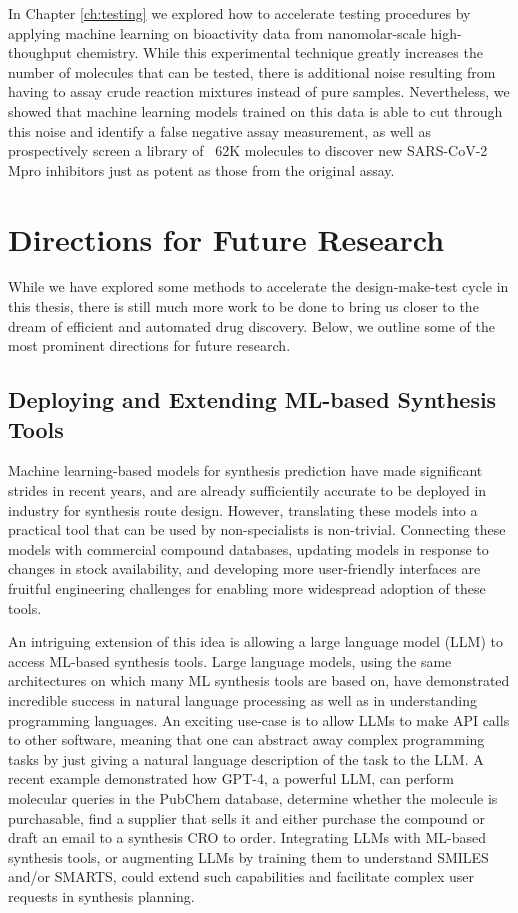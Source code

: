 In Chapter \ref{ch:testing} we explored how to accelerate testing procedures by applying machine learning on bioactivity data from nanomolar-scale high-thoughput chemistry. While this experimental technique greatly increases the number of molecules that can be tested, there is additional noise resulting from having to assay crude reaction mixtures instead of pure samples. Nevertheless, we showed that machine learning models trained on this data is able to cut through this noise and identify a false negative assay measurement, as well as prospectively screen a library of ~62K molecules to discover new SARS-CoV-2 Mpro inhibitors just as potent as those from the original assay.

\section{Directions for Future Research}

While we have explored some methods to accelerate the design-make-test cycle in this thesis, there is still much more work to be done to bring us closer to the dream of efficient and automated drug discovery. Below, we outline some of the most prominent directions for future research.

\subsection{Deploying and Extending ML-based Synthesis Tools}
Machine learning-based models for synthesis prediction have made significant strides in recent years, and are already sufficientily accurate to be deployed in industry for synthesis route design. However, translating these models into a practical tool that can be used by non-specialists is non-trivial. Connecting these models with commercial compound databases, updating models in response to changes in stock availability, and developing more user-friendly interfaces are fruitful engineering challenges for enabling more widespread adoption of these tools.

An intriguing extension of this idea is allowing a large language model (LLM) to access ML-based synthesis tools. Large language models, using the same architectures on which many ML synthesis tools are based on, have demonstrated incredible success in natural language processing as well as in understanding programming languages. An exciting use-case is to allow LLMs to make API calls to other software, meaning that one can abstract away complex programming tasks by just giving a natural language description of the task to the LLM. A recent example demonstrated how GPT-4, a powerful LLM, can perform molecular queries in the PubChem database, determine whether the molecule is purchasable, find a supplier that sells it and either purchase the compound or draft an email to a synthesis CRO to order. Integrating LLMs with ML-based synthesis tools, or augmenting LLMs by training them to understand SMILES and/or SMARTS, could extend such capabilities and facilitate complex user requests in synthesis planning.

